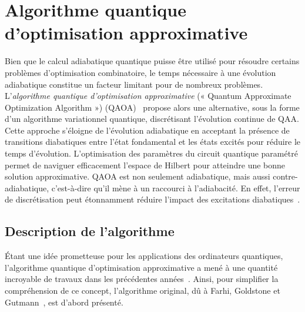 
\section{Algorithme quantique d'optimisation approximative}
\label{sec:algorithme-quantique-d'optimisation-approximative}

Bien que le calcul adiabatique quantique puisse être utilisé pour résoudre certains problèmes d'optimisation combinatoire, le temps nécessaire à une évolution adiabatique constitue un facteur limitant pour de nombreux problèmes. L'\textit{algorithme quantique d'optimisation approximative} (« Quantum Approximate Optimization Algorithm ») (QAOA)~\cite{farhiQuantumApproximateOptimization2014} propose alors une alternative, sous la forme d'un algorithme variationnel quantique, discrétisant l'évolution continue de QAA. Cette approche s'éloigne de l'évolution adiabatique en acceptant la présence de transitions diabatiques entre l'état fondamental et les états excités pour réduire le temps d'évolution. L'optimisation des paramètres du circuit quantique paramétré permet de naviguer efficacement l'espace de Hilbert pour atteindre une bonne solution approximative. QAOA est non seulement adiabatique, mais aussi contre-adiabatique, c'est-à-dire qu'il mène à un raccourci à l'adiabacité. En effet, l'erreur de discrétisation peut étonnamment réduire l'impact des excitations diabatiques~\cite{wurtzCounterdiabaticityQuantumApproximate2022}.


\subsection{Description de l'algorithme}
\label{subsec:description-algorithme}

Étant une idée prometteuse pour les applications des ordinateurs quantiques, l'algorithme quantique d'optimisation approximative a mené à une quantité incroyable de travaux dans les précédentes années~\cite{zhouQuantumApproximateOptimization2020, blekosReviewQuantumApproximate2024}. Ainsi, pour simplifier la compréhension de ce concept, l'algorithme original, dû à Farhi, Goldstone et Gutmann~\cite{farhiQuantumApproximateOptimization2014}, est d'abord présenté.

